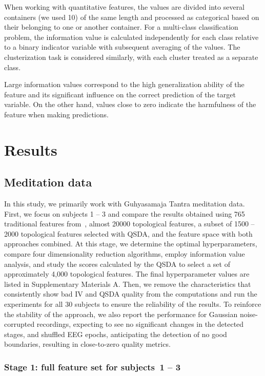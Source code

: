 \documentclass[10pt]{iopart}
\begin{document}
When working with quantitative features, the values are divided into several containers (we used 10) of the same length and processed as categorical based on their belonging to one or another container. For a multi-class classification problem, the information value is calculated independently for each class relative to a binary indicator variable with subsequent averaging of the values. The clusterization task is considered similarly, with each cluster treated as a separate class.

Large information values correspond to the high generalization ability of the feature and its significant influence on the correct prediction of the target variable. On the other hand, values close to zero indicate the harmfulness of the feature when making predictions.

\section{Results}

\subsection{Meditation data}

In this study, we primarily work with Guhyasamaja Tantra meditation data. First, we focus on subjects 1 -- 3 and compare the results obtained using 765 traditional features from~\cite{SDA}, almost 20000 topological features, a subset of 1500 -- 2000 topological features selected with QSDA, and the feature space with both approaches combined. At this stage, we determine the optimal hyperparameters, compare four dimensionality reduction algorithms, employ information value analysis, and study the scores calculated by the QSDA to select a set of approximately 4,000 topological features. The final hyperparameter values are listed in Supplementary Materials A. Then, we remove the characteristics that consistently show bad IV and QSDA quality from the computations and run the experiments for all 30 subjects to ensure the reliability of the results. To reinforce the stability of the approach, we also report the performance for Gaussian noise-corrupted recordings, expecting to see no significant changes in the detected stages, and shuffled EEG epochs, anticipating the detection of no good boundaries, resulting in close-to-zero quality metrics.

\subsubsection{Stage 1: full feature set for subjects~1 -- 3}
\end{document}
